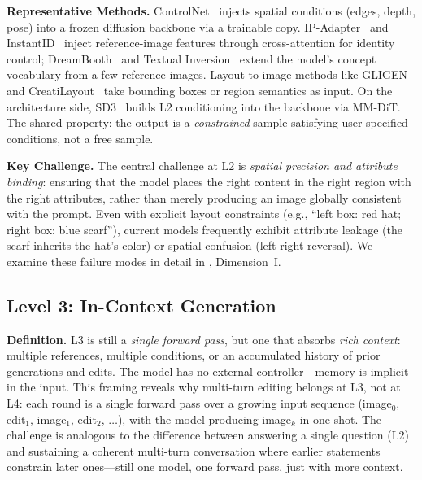 \documentclass{llmxive}
\begin{document}
\textbf{Representative Methods.} ControlNet~\citep{zhang2023controlnet} injects spatial conditions (edges, depth, pose) into a frozen diffusion backbone via a trainable copy. IP-Adapter~\citep{ye2023ip} and InstantID~\citep{wang2024instantid} inject reference-image features through cross-attention for identity control; DreamBooth~\citep{ruiz2023dreambooth} and Textual Inversion~\citep{gal2022image} extend the model's concept vocabulary from a few reference images. Layout-to-image methods like GLIGEN~\citep{li2023gligen} and CreatiLayout~\citep{CreatiLayout} take bounding boxes or region semantics as input. On the architecture side, SD3~\citep{esser2024stablediffusion3} builds L2 conditioning into the backbone via MM-DiT. The shared property: the output is a \emph{constrained} sample satisfying user-specified conditions, not a free sample.

\textbf{Key Challenge.} The central challenge at L2 is \emph{spatial precision and attribute binding}: ensuring that the model places the right content in the right region with the right attributes, rather than merely producing an image globally consistent with the prompt. Even with explicit layout constraints (e.g., ``left box: red hat; right box: blue scarf''), current models frequently exhibit attribute leakage (the scarf inherits the hat's color) or spatial confusion (left-right reversal). We examine these failure modes in detail in , Dimension~I.


\subsection{Level 3: In-Context Generation}
\label{subsec:level3}

\textbf{Definition.} L3 is still a \emph{single forward pass}, but one that absorbs \emph{rich context}: multiple references, multiple conditions, or an accumulated history of prior generations and edits. The model has no external controller---memory is implicit in the input. This framing reveals why multi-turn editing belongs at L3, not at L4: each round is a single forward pass over a growing input sequence (image$_0$, edit$_1$, image$_1$, edit$_2$, $\dots$), with the model producing image$_k$ in one shot. The challenge is analogous to the difference between answering a single question (L2) and sustaining a coherent multi-turn conversation where earlier statements constrain later ones---still one model, one forward pass, just with more context.
\end{document}
